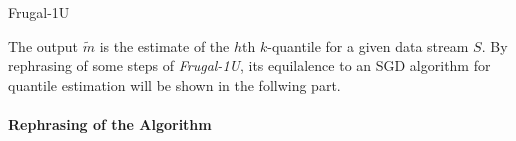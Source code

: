 \documentclass[11pt]{article}
\begin{document}
\begin{algorithm}
\caption{Frugal-1U}\label{alg:frugal_1U}
    \begin{algorithmic}[1]
                \EndIf
            \EndFor
    \end{algorithmic}
\end{algorithm}
The output $\tilde{m}$ is the estimate of the $h$th $k$-quantile for a given data stream $S$. 
By rephrasing of some steps of \textit{Frugal-1U}, 
its equilalence to an SGD algorithm for quantile estimation will be shown in the follwing part.
\\\\
\textbf{Rephrasing of the Algorithm} \label{replacements}
\end{document}
